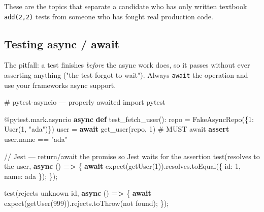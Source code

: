 \documentclass[11pt]{article}
\newenvironment{Shaded}{\begin{snugshade}}{\end{snugshade}}
\newcommand{\AttributeTok}[1]{\textcolor[rgb]{0.16,0.50,0.73}{#1}}
\newcommand{\CommentTok}[1]{\textcolor[rgb]{0.48,0.49,0.49}{#1}}
\newcommand{\ControlFlowTok}[1]{\textcolor[rgb]{0.99,0.74,0.29}{\textbf{#1}}}
\newcommand{\DataTypeTok}[1]{\textcolor[rgb]{0.16,0.50,0.73}{#1}}
\newcommand{\DecValTok}[1]{\textcolor[rgb]{0.96,0.45,0.00}{#1}}
\newcommand{\FunctionTok}[1]{\textcolor[rgb]{0.56,0.27,0.68}{#1}}
\newcommand{\ImportTok}[1]{\textcolor[rgb]{0.15,0.68,0.38}{#1}}
\newcommand{\KeywordTok}[1]{\textcolor[rgb]{0.81,0.81,0.76}{\textbf{#1}}}
\newcommand{\NormalTok}[1]{\textcolor[rgb]{0.81,0.81,0.76}{#1}}
\newcommand{\OperatorTok}[1]{\textcolor[rgb]{0.81,0.81,0.76}{#1}}
\newcommand{\StringTok}[1]{\textcolor[rgb]{0.96,0.31,0.31}{#1}}
\begin{document}
These are the topics that separate a candidate who has only written textbook \texttt{add(2,2)} tests from someone who has fought real production code.

\subsection{Testing async / await}\label{testing-async--await}

The pitfall: a test finishes \emph{before} the async work does, so it passes without ever asserting anything ("the test forgot to wait"). Always \texttt{await} the operation and use your framework\textquotesingle s async support.


\begin{Shaded}
\begin{Highlighting}[]
\CommentTok{\# pytest{-}asyncio — properly awaited}
\ImportTok{import}\NormalTok{ pytest}

\AttributeTok{@pytest.mark.asyncio}
\ControlFlowTok{async} \KeywordTok{def}\NormalTok{ test\_fetch\_user():}
\NormalTok{    repo }\OperatorTok{=}\NormalTok{ FakeAsyncRepo(\{}\DecValTok{1}\NormalTok{: User(}\DecValTok{1}\NormalTok{, }\StringTok{"ada"}\NormalTok{)\})}
\NormalTok{    user }\OperatorTok{=} \ControlFlowTok{await}\NormalTok{ get\_user(repo, }\DecValTok{1}\NormalTok{)        }\CommentTok{\# MUST await}
    \ControlFlowTok{assert}\NormalTok{ user.name }\OperatorTok{==} \StringTok{"ada"}
\end{Highlighting}
\end{Shaded}


\begin{Shaded}
\begin{Highlighting}[]
\CommentTok{// Jest — return/await the promise so Jest waits for the assertion}
\FunctionTok{test}\NormalTok{(}\StringTok{\textquotesingle{}resolves to the user\textquotesingle{}}\OperatorTok{,} \KeywordTok{async}\NormalTok{ () }\KeywordTok{=\textgreater{}}\NormalTok{ \{}
  \ControlFlowTok{await} \FunctionTok{expect}\NormalTok{(}\FunctionTok{getUser}\NormalTok{(}\DecValTok{1}\NormalTok{))}\OperatorTok{.}\AttributeTok{resolves}\OperatorTok{.}\FunctionTok{toEqual}\NormalTok{(\{ }\DataTypeTok{id}\OperatorTok{:} \DecValTok{1}\OperatorTok{,} \DataTypeTok{name}\OperatorTok{:} \StringTok{\textquotesingle{}ada\textquotesingle{}}\NormalTok{ \})}\OperatorTok{;}
\NormalTok{\})}\OperatorTok{;}

\FunctionTok{test}\NormalTok{(}\StringTok{\textquotesingle{}rejects unknown id\textquotesingle{}}\OperatorTok{,} \KeywordTok{async}\NormalTok{ () }\KeywordTok{=\textgreater{}}\NormalTok{ \{}
  \ControlFlowTok{await} \FunctionTok{expect}\NormalTok{(}\FunctionTok{getUser}\NormalTok{(}\DecValTok{999}\NormalTok{))}\OperatorTok{.}\AttributeTok{rejects}\OperatorTok{.}\FunctionTok{toThrow}\NormalTok{(}\StringTok{\textquotesingle{}not found\textquotesingle{}}\NormalTok{)}\OperatorTok{;}
\NormalTok{\})}\OperatorTok{;}
\end{Highlighting}
\end{Shaded}
\end{document}
